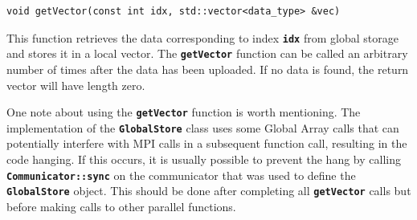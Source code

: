 {
\color{red}
\begin{Verbatim}[fontseries=b]
void getVector(const int idx, std::vector<data_type> &vec)
\end{Verbatim}
}

This function retrieves the data corresponding to index \texttt{\textbf{idx}} from global storage and stores it in a local vector. The \texttt{\textbf{getVector}} function can be called an arbitrary number of times after the data has been uploaded. If no data is found, the return vector will have length zero.

One note about using the \texttt{\textbf{getVector}} function is worth mentioning. The implementation of the \texttt{\textbf{GlobalStore}} class uses some Global Array calls that can potentially interfere with MPI calls in a subsequent function call, resulting in the code hanging. If this occurs, it is usually possible to prevent the hang by calling \texttt{\textbf{Communicator::sync}} on the communicator that was used to define the \texttt{\textbf{GlobalStore}} object. This should be done after completing all \texttt{\textbf{getVector}} calls but before making calls to other parallel functions.
\newline
\hyperlink{topDoc}{\color{blue}{Top}}
